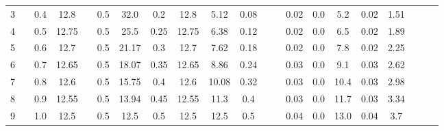 \documentclass[a4paper,12pt]{article}
\begin{document}
\begin{table}[htp]
\begin{adjustwidth}{-2.2cm}{}
\begin{tabular}{|c|c|c|c|c|c|c|c|c|c|c|c|c|c|c|c|c|c|c|c|c|}
3     &                      & 0.4 & 12.8  &                       & 0.5  & 32.0  & 0.2  & 12.8  & 5.12  & 0.08 &                        &                         & 0.02      & 0.0       & 5.2  & 0.02   & 1.51       &                       &                       &                       \\ \cline{1-1} \cline{3-4} \cline{6-11} \cline{14-18}
4     &                      & 0.5 & 12.75 &                       & 0.5  & 25.5  & 0.25 & 12.75 & 6.38  & 0.12 &                        &                         & 0.02      & 0.0       & 6.5  & 0.02   & 1.89       &                       &                       &                       \\ \cline{1-1} \cline{3-4} \cline{6-11} \cline{14-18}
5     &                      & 0.6 & 12.7  &                       & 0.5  & 21.17 & 0.3  & 12.7  & 7.62  & 0.18 &                        &                         & 0.02      & 0.0       & 7.8  & 0.02   & 2.25       &                       &                       &                       \\ \cline{1-1} \cline{3-4} \cline{6-11} \cline{14-18}
6     &                      & 0.7 & 12.65 &                       & 0.5  & 18.07 & 0.35 & 12.65 & 8.86  & 0.24 &                        &                         & 0.03      & 0.0       & 9.1  & 0.03   & 2.62       &                       &                       &                       \\ \cline{1-1} \cline{3-4} \cline{6-11} \cline{14-18}
7     &                      & 0.8 & 12.6  &                       & 0.5  & 15.75 & 0.4  & 12.6  & 10.08 & 0.32 &                        &                         & 0.03      & 0.0       & 10.4 & 0.03   & 2.98       &                       &                       &                       \\ \cline{1-1} \cline{3-4} \cline{6-11} \cline{14-18}
8     &                      & 0.9 & 12.55 &                       & 0.5  & 13.94 & 0.45 & 12.55 & 11.3  & 0.4  &                        &                         & 0.03      & 0.0       & 11.7 & 0.03   & 3.34       &                       &                       &                       \\ \cline{1-1} \cline{3-4} \cline{6-11} \cline{14-18}
9     &                      & 1.0 & 12.5  &                       & 0.5  & 12.5  & 0.5  & 12.5  & 12.5  & 0.5  &                        &                         & 0.04      & 0.0       & 13.0 & 0.04   & 3.7        &                       &                       &                       \\ \cline{1-1} \cline{3-4} \cline{6-11} \cline{14-18}

\end{tabular}
\end{adjustwidth}
\end{table}
\end{document}
